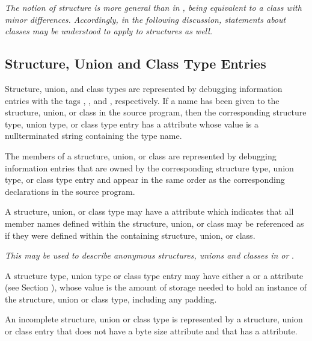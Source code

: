 \textit{The  notion of
structure is more general than in , being
equivalent to a class with minor differences. Accordingly,
in the following discussion, statements about
 classes may
be understood to apply to  structures as well.}

\subsection{Structure, Union and Class Type Entries}
\label{chap:structureunionandclasstypeentries}
Structure, union, and class types are represented by debugging
information entries
with
the tags
\DWTAGstructuretypeTARG,
\DWTAGuniontypeTARG,
and \DWTAGclasstypeTARG,
respectively. If a name has been given to the structure,
union, or class in the source program, then the corresponding
structure type, union type, or class type entry has a
\DWATname{} attribute
whose value is a null\dash terminated string
containing the type name.

The members of a structure, union, or class are represented
by debugging information entries that are owned by the
corresponding structure type, union type, or class type entry
and appear in the same order as the corresponding declarations
in the source program.

A structure, union, or class type may have a \DWATexportsymbolsDEFN{}
attribute
which indicates that all member names defined within
the structure, union, or class may be referenced as if they were
defined within the containing structure, union, or class.

\textit{This may be used to describe anonymous structures, unions
and classes in  or }.

A\hypertarget{chap:DWATbitsizedatamemberbitsize}{}
structure type, union type or class type entry may have
either a \DWATbytesize{} or a \DWATbitsize{} attribute
(see Section ),
whose value is the amount of storage needed
to hold an instance of the structure, union or class type,
including any padding.

An incomplete structure, union or class type
is represented by a structure, union or class
entry that does not have a byte size attribute and that has
a \DWATdeclaration{} attribute.

